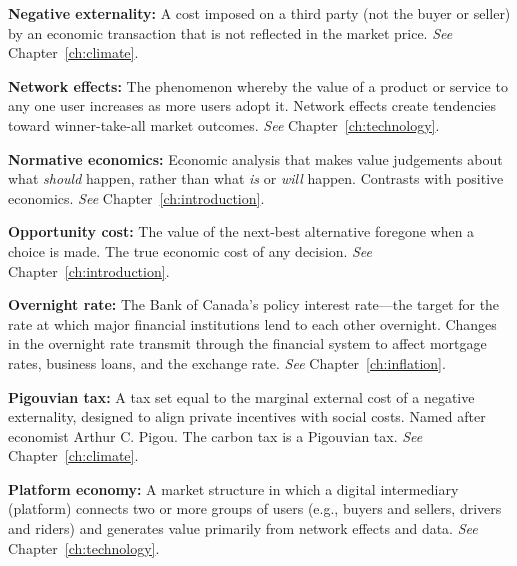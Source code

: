 \vspace{6pt}
\noindent\textbf{Negative externality:} A cost imposed on a third party (not the buyer or seller) by an economic transaction that is not reflected in the market price. \textit{See} Chapter~\ref{ch:climate}.

\vspace{6pt}
\noindent\textbf{Network effects:} The phenomenon whereby the value of a product or service to any one user increases as more users adopt it. Network effects create tendencies toward winner-take-all market outcomes. \textit{See} Chapter~\ref{ch:technology}.

\vspace{6pt}
\noindent\textbf{Normative economics:} Economic analysis that makes value judgements about what \textit{should} happen, rather than what \textit{is} or \textit{will} happen. Contrasts with positive economics. \textit{See} Chapter~\ref{ch:introduction}.

\vspace{6pt}
\noindent\textbf{Opportunity cost:} The value of the next-best alternative foregone when a choice is made. The true economic cost of any decision. \textit{See} Chapter~\ref{ch:introduction}.

\vspace{6pt}
\noindent\textbf{Overnight rate:} The Bank of Canada's policy interest rate---the target for the rate at which major financial institutions lend to each other overnight. Changes in the overnight rate transmit through the financial system to affect mortgage rates, business loans, and the exchange rate. \textit{See} Chapter~\ref{ch:inflation}.

\vspace{6pt}
\noindent\textbf{Pigouvian tax:} A tax set equal to the marginal external cost of a negative externality, designed to align private incentives with social costs. Named after economist Arthur C. Pigou. The carbon tax is a Pigouvian tax. \textit{See} Chapter~\ref{ch:climate}.

\vspace{6pt}
\noindent\textbf{Platform economy:} A market structure in which a digital intermediary (platform) connects two or more groups of users (e.g., buyers and sellers, drivers and riders) and generates value primarily from network effects and data. \textit{See} Chapter~\ref{ch:technology}.

